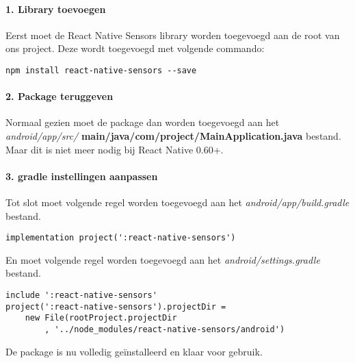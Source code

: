 \paragraph{1. Library toevoegen}
Eerst moet de React Native Sensors library worden toegevoegd aan de root van ons project.
Deze wordt toegevoegd met volgende commando:
\begin{verbatim}
npm install react-native-sensors --save
\end{verbatim}

\paragraph{2. Package teruggeven}
Normaal gezien moet de package dan worden toegevoegd aan het 
\textit{android/app/src/} \textbf{main/java/com/project/MainApplication.java} bestand.
Maar dit is niet meer nodig bij React Native 0.60+.

\paragraph{3. gradle instellingen aanpassen}
Tot slot moet volgende regel worden toegevoegd aan het \textit{android/app/build.gradle} bestand.
\begin{verbatim}
implementation project(':react-native-sensors')
\end{verbatim}
En moet volgende regel worden toegevoegd aan het \textit{android/settings.gradle} bestand.
\begin{verbatim}
include ':react-native-sensors'
project(':react-native-sensors').projectDir = 
    new File(rootProject.projectDir
        , '../node_modules/react-native-sensors/android')
\end{verbatim}
De package is nu volledig geïnstalleerd en klaar voor gebruik.

